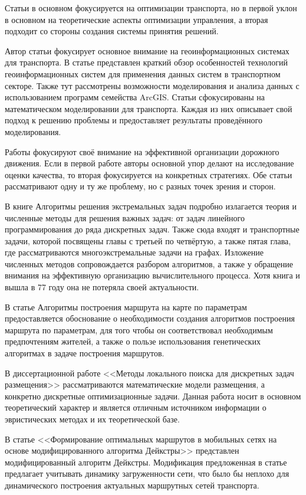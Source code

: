 Статьи \cite{bib:35,bib:36} в основном фокусируется на оптимизации транспорта, но в первой уклон в основном 
на теоретические аспекты оптимизации управления, а вторая подходит со стороны создания системы принятия 
решений.

Автор статьи \cite{bib:33} фокусирует основное внимание на геоинформационных системах для транспорта. 
В статье представлен краткий обзор особенностей технологий геоинформационных систем для применения данных 
систем в транспортном секторе. Также тут рассмотрены возможности моделирования и анализа данных с 
использованием программ семейства ArcGIS. Статьи \cite{bib:37,bib:38,bib:41} сфокусированы на математическом 
моделировании для транспорта. Каждая из них описывает свой подход к решению проблемы и предоставляет 
результаты проведённого моделирования.

Работы \cite{bib:42,bib:43} фокусируют своё внимание на эффективной организации дорожного движения. Если в 
первой работе авторы основной упор делают на исследование оценки качества, то вторая фокусируется на 
конкретных стратегиях. Обе статьи рассматривают одну и ту же проблему, но с разных точек зрения и сторон.

В книге Алгоритмы решения экстремальных задач\cite{bib:56} подробно излагается теория и численные методы 
для решения важных задач: от задач линейного программирования до ряда дискретных задач. Также сюда входят 
и транспортные задачи, которой посвящены главы с третьей по четвёртую, а также пятая глава, где 
рассматриваются многоэкстремальные задачи на графах. Изложение численных методов сопровождается разбором 
алгоритмов, а также у обращение внимания на эффективную организацию вычислительного процесса. Хотя книга 
и вышла в 77 году она не потеряла своей актуальности.

В статье Алгоритмы построения маршрута на карте по параметрам\cite{bib:46} предоставляется обоснование 
о необходимости создания алгоритмов построения маршрута по параметрам, для того чтобы он соответствовал 
необходимым предпочтениям жителей, а также о пользе использования генетических алгоритмах в задаче 
построения маршрутов.

В диссертационной работе <<Методы локального поиска для дискретных задач размещения>>\cite{bib:45} 
рассматриваются математические модели размещения, а конкретно дискретные оптимизационные задачи. Данная 
работа носит в основном теоретический характер и является отличным источником информации о эвристических 
методах и их теоретической базе.

В статье <<Формирование оптимальных маршрутов в мобильных сетях на основе модифицированного алгоритма 
Дейкстры>>\cite{bib:55} представлен модифицированный алгоритм Дейкстры. Модификация предложенная в статье 
предлагает учитывать динамику загруженности сети, что было бы неплохо для динамического построения 
актуальных маршрутных сетей транспорта.

